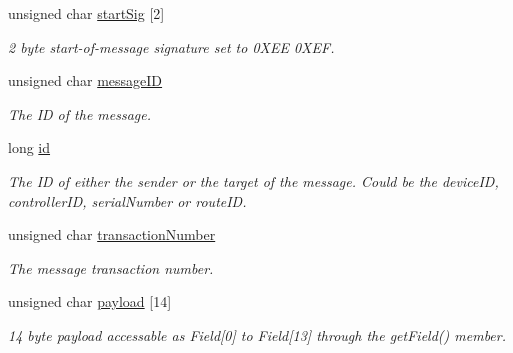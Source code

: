 \begin{DoxyCompactItemize}
\item 
\mbox{\label{struct_u_d_p_message_struct_a40c0afec4be20d7cfaac97b3ec90cb56}} 
unsigned char \hyperlink{struct_u_d_p_message_struct_a40c0afec4be20d7cfaac97b3ec90cb56}{start\+Sig} \mbox{[}2\mbox{]}
\begin{DoxyCompactList}\small\item\em 2 byte start-\/of-\/message signature set to 0\+X\+EE 0\+X\+EF. \end{DoxyCompactList}\item 
\mbox{\label{struct_u_d_p_message_struct_a5b9f258b174a6d6a738baa8033243573}} 
unsigned char \hyperlink{struct_u_d_p_message_struct_a5b9f258b174a6d6a738baa8033243573}{message\+ID}
\begin{DoxyCompactList}\small\item\em The ID of the message. \end{DoxyCompactList}\item 
\mbox{\label{struct_u_d_p_message_struct_a363553f26a5a6b317dc5b0b4c227f966}} 
long \hyperlink{struct_u_d_p_message_struct_a363553f26a5a6b317dc5b0b4c227f966}{id}
\begin{DoxyCompactList}\small\item\em The ID of either the sender or the target of the message. Could be the device\+ID, controller\+ID, serial\+Number or route\+ID. \end{DoxyCompactList}\item 
\mbox{\label{struct_u_d_p_message_struct_a98ed3cc3a244ee9637f6b85fcf6165b8}} 
unsigned char \hyperlink{struct_u_d_p_message_struct_a98ed3cc3a244ee9637f6b85fcf6165b8}{transaction\+Number}
\begin{DoxyCompactList}\small\item\em The message transaction number. \end{DoxyCompactList}\item 
\mbox{\label{struct_u_d_p_message_struct_a52de02b6a926e10a0ef99c1ae965719e}} 
unsigned char \hyperlink{struct_u_d_p_message_struct_a52de02b6a926e10a0ef99c1ae965719e}{payload} \mbox{[}14\mbox{]}
\begin{DoxyCompactList}\small\item\em 14 byte payload accessable as Field\mbox{[}0\mbox{]} to Field\mbox{[}13\mbox{]} through the get\+Field() member. \end{DoxyCompactList}\item 

\end{DoxyCompactItemize}
